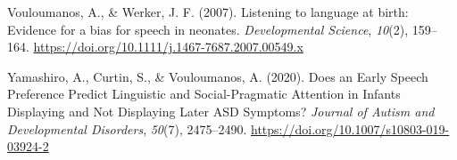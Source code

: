 \documentclass[
  man,mask,floatsintext]{apa6}
\newlength{\cslhangindent}
\newlength{\cslentryspacingunit} %
\newenvironment{CSLReferences}[2] %
 {%
  \setlength{\parindent}{0pt}
  \ifodd #1
  \let\oldpar\par
  \def\par{\hangindent=\cslhangindent\oldpar}
  \fi
  \setlength{\parskip}{#2\cslentryspacingunit}
 }%
 {}
\begin{document}
\begin{CSLReferences}{1}{0}
\leavevmode{}%
Vouloumanos, A., \& Werker, J. F. (2007). Listening to language at birth: Evidence for a bias for speech in neonates. \emph{Developmental Science}, \emph{10}(2), 159--164. \url{https://doi.org/10.1111/j.1467-7687.2007.00549.x}

\leavevmode{}%
Yamashiro, A., Curtin, S., \& Vouloumanos, A. (2020). Does an {Early} {Speech} {Preference} {Predict} {Linguistic} and {Social}-{Pragmatic} {Attention} in {Infants} {Displaying} and {Not} {Displaying} {Later} {ASD} {Symptoms}? \emph{Journal of Autism and Developmental Disorders}, \emph{50}(7), 2475--2490. \url{https://doi.org/10.1007/s10803-019-03924-2}

\end{CSLReferences}

\endgroup
\end{document}
